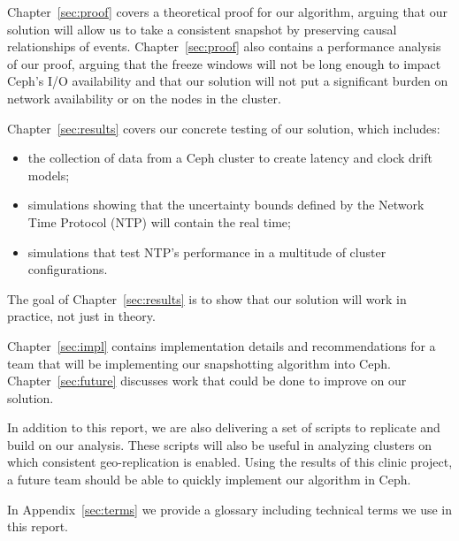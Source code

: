 Chapter~\ref{sec:proof} covers a theoretical proof for our algorithm,
arguing that our solution will allow us to take a consistent snapshot
by preserving causal relationships of events. Chapter~\ref{sec:proof} also
contains a performance analysis of our proof, arguing that the freeze
windows will not be long enough to impact Ceph's I/O availability and that our
solution will not put a significant burden on network availability or
on the nodes in the cluster.

Chapter~\ref{sec:results} covers our concrete testing of our solution,
which includes:

\begin{itemize}
\item the collection of data from a Ceph cluster to create
  latency and clock drift models;
\item simulations showing that the uncertainty bounds defined by the
  Network Time Protocol (NTP) will contain the real time;
\item simulations that test NTP's performance in a multitude of
  cluster configurations.
\end{itemize}
The goal of Chapter~\ref{sec:results} is to show that our solution will work
in practice, not just in theory.

Chapter~\ref{sec:impl} contains implementation details and
recommendations for a team that will be implementing our snapshotting algorithm
into Ceph. Chapter~\ref{sec:future} discusses work that could be done
to improve on our solution.

In addition to this report, we are also delivering a set of scripts to
replicate and build on our analysis. These scripts will also be useful
in analyzing clusters on which consistent geo-replication is
enabled. Using the results of this clinic project, a future team
should be able to quickly implement our algorithm in Ceph.

In Appendix~\ref{sec:terms} we provide
a glossary including technical terms we use in this report.
